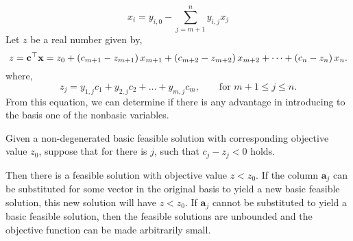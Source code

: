 \begin{equation*}
	x_i=y_{i,0}-\sum_{j=m+1}^{n} y_{i,j}x_{j}
\end{equation*}
Let $z$ be a real number given by,
\begin{equation}
	z=\mathbf{c}^\top \mathbf{x}=z_0+\left( c_{m+1}-z_{m+1} \right)x_{m+1}+\left( c_{m+2}-z_{m+2} \right)x_{m+2}+\dots+\left( c_{n}-z_{n} \right)x_{n}.  \label{eq: cost after pivot}
\end{equation}
where,
\begin{equation}
	z_{j}=y_{1,j}c_1+y_{2,j} c_2 +\dots +y_{m,j}c_{m}, \qquad \text{for } m+1\leq j\leq n. \label{eq: i cost after pivot}
\end{equation}
From this equation, we can determine if there is any advantage in introducing to the basis one of the nonbasic variables.
\begin{theorem}

Given a non-degenerated basic feasible solution with corresponding objective value $z_0$, suppose that for there is $j$, such that $c_j − z_j < 0$ holds. 

Then there is a feasible solution with objective value $z < z_0$. If the column $\mathbf{a}_j$ can be substituted for some vector in the original basis to yield a new basic feasible solution, this new solution will have $z<z_0$. If $\mathbf{a}_j$ cannot be substituted to yield a basic feasible solution, then the feasible solutions are unbounded and the objective function can be made arbitrarily small.
\end{theorem}



%

